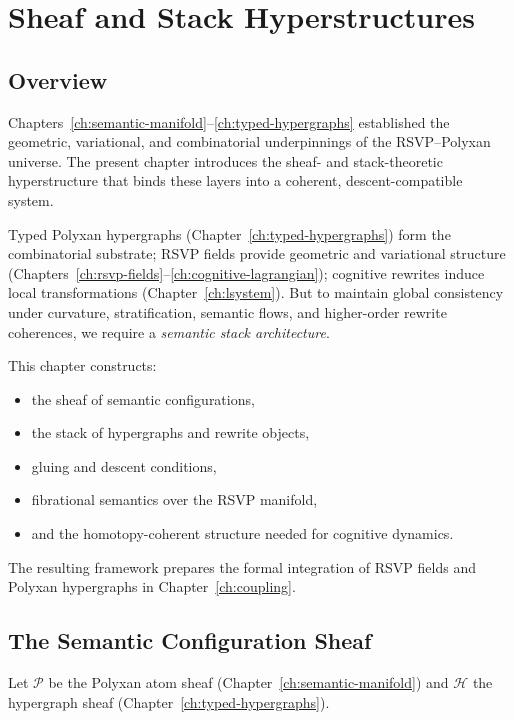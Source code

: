 \chapter{Sheaf and Stack Hyperstructures}
\label{ch:sheaf-hyperstructures}

\section{Overview}

Chapters~\ref{ch:semantic-manifold}--\ref{ch:typed-hypergraphs}
established the geometric, variational, and combinatorial underpinnings of the
RSVP--Polyxan universe. The present chapter introduces the sheaf- and
stack-theoretic hyperstructure that binds these layers into a coherent,
descent-compatible system.

Typed Polyxan hypergraphs (Chapter~\ref{ch:typed-hypergraphs}) form the
combinatorial substrate; RSVP fields provide geometric and variational
structure (Chapters~\ref{ch:rsvp-fields}--\ref{ch:cognitive-lagrangian});
cognitive rewrites induce local transformations
(Chapter~\ref{ch:lsystem}).  
But to maintain global consistency under curvature, stratification, semantic
flows, and higher-order rewrite coherences, we require a \emph{semantic stack
architecture}.

This chapter constructs:
\begin{itemize}
  \item the sheaf of semantic configurations,
  \item the stack of hypergraphs and rewrite objects,
  \item gluing and descent conditions,
  \item fibrational semantics over the RSVP manifold,
  \item and the homotopy-coherent structure needed for cognitive dynamics.
\end{itemize}

The resulting framework prepares the formal integration of RSVP fields and
Polyxan hypergraphs in Chapter~\ref{ch:coupling}.

\section{The Semantic Configuration Sheaf}

Let $\mathscr{P}$ be the Polyxan atom sheaf (Chapter~\ref{ch:semantic-manifold})
and $\mathscr{H}$ the hypergraph sheaf (Chapter~\ref{ch:typed-hypergraphs}).

